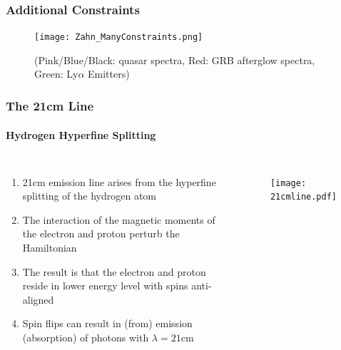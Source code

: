 \documentclass{beamer}
\begin{document}

\begin{frame}
\frametitle{Additional Constraints}
\begin{figure}[h]
  \centering
  \texttt{[image: Zahn\_ManyConstraints.png]}
  \caption{{\tiny \cite{Zahn:2011vp}} (Pink/Blue/Black: quasar spectra, Red: GRB afterglow spectra, Green: Ly$\alpha$ Emitters)}
  \label{fig:todo}
\end{figure}
\end{frame}


\begin{frame}
\frametitle{The 21cm Line}
\framesubtitle{Hydrogen Hyperfine Splitting}
\begin{columns}[l]
\column{2.4in}
\begin{enumerate}[-]
\item 21cm emission line arises from the hyperfine splitting of the hydrogen atom
\item The interaction of the magnetic moments of the electron and proton perturb the Hamiltonian
\item The result is that the electron and proton reside in lower energy level with spins anti-aligned
\item Spin flips can result in (from) emission (absorption) of photons with $\lambda = 21\text{cm}$
\end{enumerate}
\column{1.8in}
\begin{figure}[h]
  \centering
  \texttt{[image: 21cmline.pdf]}
  \label{fig:21cmline}
\end{figure}
\end{columns}
\end{frame}
\end{document}
